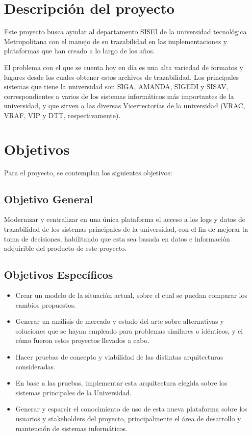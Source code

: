 \section{Descripción del proyecto}

Este proyecto busca ayudar al departamento SISEI de la universidad tecnológica Metropolitana con el manejo de su trazabilidad en las implementaciones y plataformas que han creado a lo largo de los años.

El problema con el que se cuenta hoy en día es una alta variedad de formatos y lugares desde los cuales obtener estos archivos de trazabilidad. Los principales sistemas que tiene la universidad son SIGA, AMANDA, SIGEDI y SISAV, correspondientes a varios de los sistemas informáticos más importantes de la universidad, y que sirven a las diversas Vicerrectorías de la universidad (VRAC, VRAF, VIP y DTT, respectivamente).

\lipsum[2]

\section{Objetivos}

Para el proyecto, se contemplan los siguientes objetivos:

\subsection{Objetivo General}

Modernizar y centralizar en una única plataforma el acceso a los logs y datos de trazabilidad de los sistemas principales de la universidad, con el fin de mejorar la toma de decisiones, habilitando que esta sea basada en datos e información adquirible del producto de este proyecto.

\subsection{Objetivos Específicos}

\begin{itemize}
	\item Crear un modelo de la situación actual, sobre el cual se puedan comparar los cambios propuestos.
	\item Generar un análisis de mercado y estado del arte sobre alternativas y soluciones que se hayan empleado para problemas similares o idénticos, y el cómo fueron estos proyectos llevados a cabo.
	\item Hacer pruebas de concepto y viabilidad de las distintas arquitecturas consideradas.
	\item En base a las pruebas, implementar esta arquitectura elegida sobre los sistemas principales de la Universidad.
	\item Generar y esparcir el conocimiento de uso de esta nueva plataforma sobre los usuarios y stakeholders del proyecto, principalmente el área de desarrollo y mantención de sistemas informáticos.
\end{itemize}

